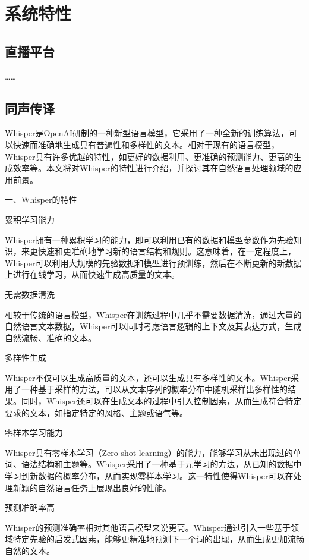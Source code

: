 \newpage

\chapter{系统特性}
\label{ch:system-feature}

\section{直播平台}

……

\section{同声传译}

Whisper是OpenAI研制的一种新型语言模型，它采用了一种全新的训练算法，可以快速而准确地生成具有普遍性和多样性的文本。相对于现有的语言模型，Whisper具有许多优越的特性，如更好的数据利用、更准确的预测能力、更高的生成效率等。本文将对Whisper的特性进行介绍，并探讨其在自然语言处理领域的应用前景。

一、Whisper的特性

累积学习能力

Whisper拥有一种累积学习的能力，即可以利用已有的数据和模型参数作为先验知识，来更快速和更准确地学习新的语言结构和规则。这意味着，在一定程度上，Whisper可以利用大规模的先验数据和模型进行预训练，然后在不断更新的新数据上进行在线学习，从而快速生成高质量的文本。

无需数据清洗

相较于传统的语言模型，Whisper在训练过程中几乎不需要数据清洗，通过大量的自然语言文本数据，Whisper可以同时考虑语言逻辑的上下文及其表达方式，生成自然流畅、准确的文本。

多样性生成

Whisper不仅可以生成高质量的文本，还可以生成具有多样性的文本。Whisper采用了一种基于采样的方法，可以从文本序列的概率分布中随机采样出多样性的结果。同时，Whisper还可以在生成文本的过程中引入控制因素，从而生成符合特定要求的文本，如指定特定的风格、主题或语气等。

零样本学习能力

Whisper具有零样本学习（Zero-shot learning）的能力，能够学习从未出现过的单词、语法结构和主题等。Whisper采用了一种基于元学习的方法，从已知的数据中学习到新数据的概率分布，从而实现零样本学习。这一特性使得Whisper可以在处理新颖的自然语言任务上展现出良好的性能。

预测准确率高

Whisper的预测准确率相对其他语言模型来说更高。Whisper通过引入一些基于领域特定先验的启发式因素，能够更精准地预测下一个词的出现，从而生成更加流畅自然的文本。

